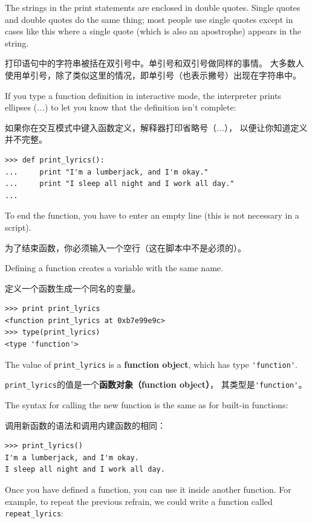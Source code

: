 \documentclass[10pt]{book}
\begin{document}
\begin{CJK}{UTF8}{gbsn}
The strings in the print statements are enclosed in double
quotes.  Single quotes and double quotes do the same thing;
most people use single quotes except in cases like this where
a single quote (which is also an apostrophe) appears in the string.

打印语句中的字符串被括在双引号中。单引号和双引号做同样的事情。
大多数人使用单引号，除了类似这里的情况，即单引号（也表示撇号）出现在字符串中。

If you type a function definition in interactive mode, the interpreter
prints ellipses ({\em ...}) to let you know that the definition
isn't complete:

如果你在交互模式中键入函数定义，解释器打印省略号（{\em ...}），
以便让你知道定义并不完整。

\begin{verbatim}
>>> def print_lyrics():
...     print "I'm a lumberjack, and I'm okay."
...     print "I sleep all night and I work all day."
...
\end{verbatim}
%
To end the function, you have to enter an empty line (this is
not necessary in a script).

为了结束函数，你必须输入一个空行（这在脚本中不是必须的）。

Defining a function creates a variable with the same name.

定义一个函数生成一个同名的变量。

\begin{verbatim}
>>> print print_lyrics
<function print_lyrics at 0xb7e99e9c>
>>> type(print_lyrics)
<type 'function'>
\end{verbatim}
%
The value of \verb"print_lyrics" is a {\bf function object}, which
has type \verb"'function'".

\verb"print_lyrics"的值是一个{\bf 函数对象（function object）}，
其类型是\verb"'function'"。

The syntax for calling the new function is the same as
for built-in functions:

调用新函数的语法和调用内建函数的相同：

\begin{verbatim}
>>> print_lyrics()
I'm a lumberjack, and I'm okay.
I sleep all night and I work all day.
\end{verbatim}
%
Once you have defined a function, you can use it inside another
function.  For example, to repeat the previous refrain, we could write
a function called \verb"repeat_lyrics":


\end{CJK}
\end{document}
